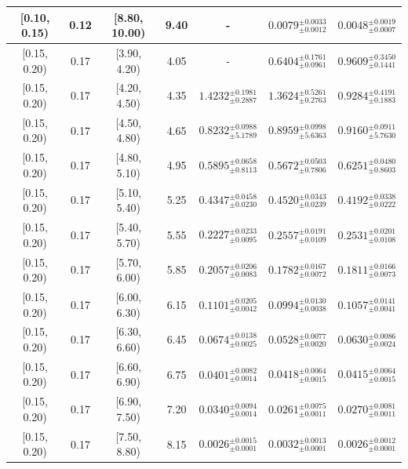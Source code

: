 \begin{longtable}{|c|c|c|c|c|c|c|}
\hline
[0.10, 0.15) & 0.12 & [8.80, 10.00) & 9.40 & - & $0.0079^{ \pm 0.0033 }_{ \pm 0.0012 }$ & $0.0048^{ \pm 0.0019 }_{ \pm 0.0007 }$ \\ 
\hline
[0.15, 0.20) & 0.17 & [3.90, 4.20) & 4.05 & - & $0.6404^{ \pm 0.1761 }_{ \pm 0.0961 }$ & $0.9609^{ \pm 0.3450 }_{ \pm 0.1441 }$ \\ 
\hline
[0.15, 0.20) & 0.17 & [4.20, 4.50) & 4.35 & $1.4232^{ \pm 0.1981 }_{ \pm 0.2887 }$ & $1.3624^{ \pm 0.5261 }_{ \pm 0.2763 }$ & $0.9284^{ \pm 0.4191 }_{ \pm 0.1883 }$ \\ 
\hline
[0.15, 0.20) & 0.17 & [4.50, 4.80) & 4.65 & $0.8232^{ \pm 0.0988 }_{ \pm 5.1789 }$ & $0.8959^{ \pm 0.0998 }_{ \pm 5.6363 }$ & $0.9160^{ \pm 0.0911 }_{ \pm 5.7630 }$ \\ 
\hline
[0.15, 0.20) & 0.17 & [4.80, 5.10) & 4.95 & $0.5895^{ \pm 0.0658 }_{ \pm 0.8113 }$ & $0.5672^{ \pm 0.0503 }_{ \pm 0.7806 }$ & $0.6251^{ \pm 0.0480 }_{ \pm 0.8603 }$ \\ 
\hline
[0.15, 0.20) & 0.17 & [5.10, 5.40) & 5.25 & $0.4347^{ \pm 0.0458 }_{ \pm 0.0230 }$ & $0.4520^{ \pm 0.0343 }_{ \pm 0.0239 }$ & $0.4192^{ \pm 0.0338 }_{ \pm 0.0222 }$ \\ 
\hline
[0.15, 0.20) & 0.17 & [5.40, 5.70) & 5.55 & $0.2227^{ \pm 0.0233 }_{ \pm 0.0095 }$ & $0.2557^{ \pm 0.0191 }_{ \pm 0.0109 }$ & $0.2531^{ \pm 0.0201 }_{ \pm 0.0108 }$ \\ 
\hline
[0.15, 0.20) & 0.17 & [5.70, 6.00) & 5.85 & $0.2057^{ \pm 0.0206 }_{ \pm 0.0083 }$ & $0.1782^{ \pm 0.0167 }_{ \pm 0.0072 }$ & $0.1811^{ \pm 0.0166 }_{ \pm 0.0073 }$ \\ 
\hline
[0.15, 0.20) & 0.17 & [6.00, 6.30) & 6.15 & $0.1101^{ \pm 0.0205 }_{ \pm 0.0042 }$ & $0.0994^{ \pm 0.0130 }_{ \pm 0.0038 }$ & $0.1057^{ \pm 0.0141 }_{ \pm 0.0041 }$ \\ 
\hline
[0.15, 0.20) & 0.17 & [6.30, 6.60) & 6.45 & $0.0674^{ \pm 0.0138 }_{ \pm 0.0025 }$ & $0.0528^{ \pm 0.0077 }_{ \pm 0.0020 }$ & $0.0630^{ \pm 0.0086 }_{ \pm 0.0024 }$ \\ 
\hline
[0.15, 0.20) & 0.17 & [6.60, 6.90) & 6.75 & $0.0401^{ \pm 0.0082 }_{ \pm 0.0014 }$ & $0.0418^{ \pm 0.0064 }_{ \pm 0.0015 }$ & $0.0415^{ \pm 0.0064 }_{ \pm 0.0015 }$ \\ 
\hline
[0.15, 0.20) & 0.17 & [6.90, 7.50) & 7.20 & $0.0340^{ \pm 0.0094 }_{ \pm 0.0014 }$ & $0.0261^{ \pm 0.0075 }_{ \pm 0.0011 }$ & $0.0270^{ \pm 0.0081 }_{ \pm 0.0011 }$ \\ 
\hline
[0.15, 0.20) & 0.17 & [7.50, 8.80) & 8.15 & $0.0026^{ \pm 0.0015 }_{ \pm 0.0001 }$ & $0.0032^{ \pm 0.0013 }_{ \pm 0.0001 }$ & $0.0026^{ \pm 0.0012 }_{ \pm 0.0001 }$ \\ 

\end{longtable}
